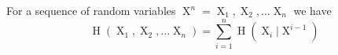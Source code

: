 For a sequence of random variables $ \operatorname{X}^{n} = \operatorname{X}_{1}, \operatorname{X}_{2}, \dots \operatorname{X}_{n}$ we have
$$\operatorname{H}( \operatorname{X}_{1}, \operatorname{X}_{2}, \dots \operatorname{X}_{n} ) = \sum\limits_{i = 1}^{n} \operatorname{H}(\operatorname{X}_{i} | \operatorname{X}^{i - 1})$$ 

